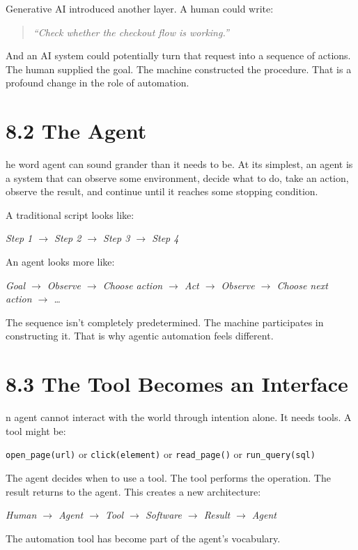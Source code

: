 \documentclass[11pt, a4paper, openany]{book}
\newcommand{\initialcap}[1]{{\fontfamily{lmss}\selectfont\huge\textbf{#1}}}
\begin{document}
Generative AI introduced another layer. A human could write:
\begin{quote}
\textit{``Check whether the checkout flow is working.''}
\end{quote}
And an AI system could potentially turn that request into a sequence of actions. The human supplied the goal. The machine constructed the procedure. That is a profound change in the role of automation.

\section{8.2 The Agent}
\noindent \initialcap{T}he word agent can sound grander than it needs to be. At its simplest, an agent is a system that can observe some environment, decide what to do, take an action, observe the result, and continue until it reaches some stopping condition.

A traditional script looks like:
\begin{center}
\textit{Step 1 $\rightarrow$ Step 2 $\rightarrow$ Step 3 $\rightarrow$ Step 4}
\end{center}
An agent looks more like:
\begin{center}
\textit{Goal $\rightarrow$ Observe $\rightarrow$ Choose action $\rightarrow$ Act $\rightarrow$ Observe $\rightarrow$ Choose next action $\rightarrow$ \dots}
\end{center}
The sequence isn't completely predetermined. The machine participates in constructing it. That is why agentic automation feels different.

\section{8.3 The Tool Becomes an Interface}
\noindent \initialcap{A}n agent cannot interact with the world through intention alone. It needs tools. A tool might be:
\begin{center}
\texttt{open\_page(url)} \quad or \quad \texttt{click(element)} \quad or \quad \texttt{read\_page()} \quad or \quad \texttt{run\_query(sql)}
\end{center}
The agent decides when to use a tool. The tool performs the operation. The result returns to the agent. This creates a new architecture:
\begin{center}
\textit{Human $\rightarrow$ Agent $\rightarrow$ Tool $\rightarrow$ Software $\rightarrow$ Result $\rightarrow$ Agent}
\end{center}
The automation tool has become part of the agent's vocabulary.
\end{document}
